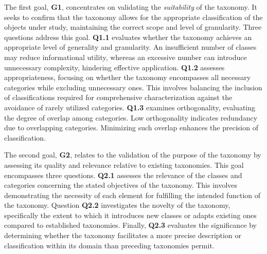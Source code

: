 The first goal, \textbf{G1}, concentrates on validating the \emph{suitability} of the taxonomy. It seeks to confirm that the taxonomy allows for the appropriate classification of the objects under study, maintaining the correct scope and level of granularity. Three questions address this goal. \textbf{Q1.1} evaluates whether the taxonomy achieves an appropriate level of generality and granularity. An insufficient number of classes may reduce informational utility, whereas an excessive number can introduce unnecessary complexity, hindering effective application. \textbf{Q1.2} assesses appropriateness, focusing on whether the taxonomy encompasses all necessary categories while excluding unnecessary ones. This involves balancing the inclusion of classifications required for comprehensive characterization against the avoidance of rarely utilized categories. \textbf{Q1.3} examines orthogonality, evaluating the degree of overlap among categories. Low orthogonality indicates redundancy due to overlapping categories. Minimizing such overlap enhances the precision of classification.

The second goal, \textbf{G2}, relates to the validation of the purpose of the taxonomy by assessing its quality and relevance relative to existing taxonomies. This goal encompasses three questions. \textbf{Q2.1} assesses the relevance of the classes and categories concerning the stated objectives of the taxonomy. This involves demonstrating the necessity of each element for fulfilling the intended function of the taxonomy. Question \textbf{Q2.2} investigates the novelty of the taxonomy, specifically the extent to which it introduces new classes or adapts existing ones compared to established taxonomies. Finally, \textbf{Q2.3} evaluates the  significance by determining whether the taxonomy facilitates a more precise description or classification within its domain than preceding taxonomies permit.


% 

